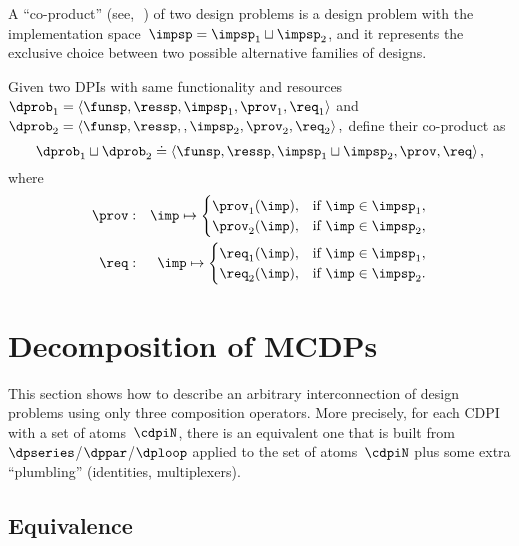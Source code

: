 A ``co-product'' (see,~\eg\,\cite[Section 2.4]{spivak14category})
of two design problems is a design problem with the implementation
space~$\impsp=\impsp_{1}\sqcup\impsp_{2}$, and it represents the
exclusive choice between two possible alternative families of designs.
\begin{definition}[Co-product]
  \label{def:parallel-1}Given two DPIs with same functionality and
  resources $\dprob_{1}=\left\langle \funsp,\ressp,\impsp_{1},\prov_{1},\req_{1}\right\rangle $
  and $\dprob_{2}=\left\langle \funsp,\ressp,,\impsp_{2},\prov_{2},\req_{2}\right\rangle ,$
  define their co-product as
  \[
    \dprob_{1}\sqcup\dprob_{2}\doteq\left\langle \funsp,\ressp,\impsp_{1}\sqcup\impsp_{2},\prov,\req\right\rangle ,
  \]
  where
  \begin{eqnarray}
    \prov & : & \imp\mapsto\begin{cases}
                             \prov_{1}(\imp), & \text{if }\imp\in\impsp_{1},\\
                             \prov_{2}(\imp), & \text{if }\imp\in\impsp_{2},
    \end{cases}\label{eq:dppar-exec-1}\\
    \req & : & \imp\mapsto\begin{cases}
                            \req_{1}(\imp), & \text{if }\imp\in\impsp_{1},\\
                            \req_{2}(\imp), & \text{if }\imp\in\impsp_{2}.
    \end{cases}\nonumber
  \end{eqnarray}

\end{definition}



\section{Decomposition of MCDPs\label{sec:Decomposition}}

\label{sec:Decomposing2}This section shows how to describe an arbitrary
interconnection of design problems using only three composition operators.
More precisely, for each CDPI with a set of atoms~$\cdpiN$, there
is an equivalent one that is built from $\dpseries$/$\dppar$/$\dploop$
applied to the set of atoms~$\cdpiN$ plus some extra ``plumbling''
(identities, multiplexers).

\subsection{Equivalence}

